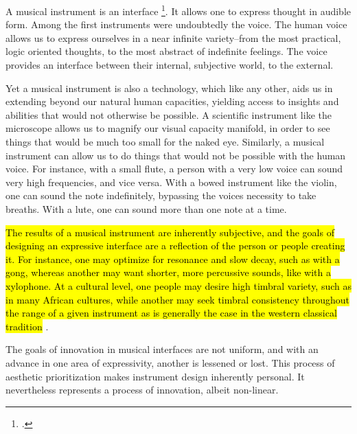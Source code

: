 \documentclass[12pt,twoside,maitrise]{dms_ks}
\theoremstyle{definition}
\begin{document}
A musical instrument is an interface \footcite{noauthor_instrument_nodate}. 
It allows one to express thought in audible form. 
Among the first instruments were undoubtedly the voice. 
The human voice allows us to express ourselves in a near infinite variety--from the most practical, logic oriented thoughts, to the most abstract of indefinite feelings. 
The voice provides an interface between their internal, subjective world, to the external. 

Yet a musical instrument is also a technology, which like any other, aids us in extending beyond our natural human capacities, yielding access to insights and abilities that would not otherwise be possible. 
A scientific instrument like the microscope allows us to magnify our visual capacity manifold, in order to see things that would be much too small for the naked eye. 
Similarly, a musical instrument can allow us to do things that would not be possible with the human voice. 
For instance, with a small flute, a person with a very low voice can sound very high frequencies, and vice versa. 
With a bowed instrument like the violin, one can sound the note indefinitely, bypassing the voices necessity to take breaths. 
With a lute, one can sound more than one note at a time. 

\hl{The results of a musical instrument are inherently subjective, and the goals of designing an expressive interface are a reflection of the person or people creating it. 
For instance, one may optimize for resonance and slow decay, such as with a gong, whereas another may want shorter, more percussive sounds, like with a xylophone. 
At a cultural level, one people may desire high timbral variety, such as in many African cultures, while another may seek timbral consistency throughout the range of a given instrument as is generally the case in the western classical tradition} . 


The goals of innovation in musical interfaces are not uniform, and with an advance in one area of expressivity, another is lessened or lost. 
This process of aesthetic prioritization makes instrument design inherently personal. It nevertheless represents a process of innovation, albeit non-linear. 
\end{document}
